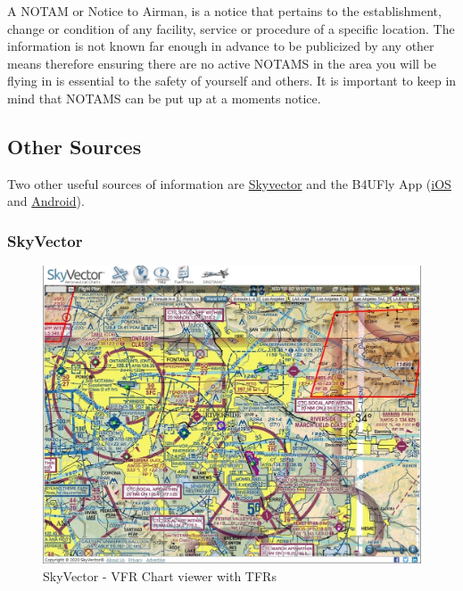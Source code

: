 \documentclass[
  12pt,
]{book}
\begin{document}
A NOTAM or Notice to Airman, is a notice that pertains to the establishment, change or condition of any facility, service or procedure of a specific location. The information is not known far enough in advance to be publicized by any other means therefore ensuring there are no active NOTAMS in the area you will be flying in is essential to the safety of yourself and others. It is important to keep in mind that NOTAMS can be put up at a moments notice.

\hypertarget{other-sources}{%
\subsection{Other Sources}\label{other-sources}}

Two other useful sources of information are \href{https://skyvector.com/}{Skyvector} and the B4UFly App (\href{https://apps.apple.com/us/app/b4ufly/id992427109}{iOS} and \href{https://play.google.com/store/apps/details?id=gov.faa.b4ufly2\&hl=en}{Android}).

\hypertarget{skyvector}{%
\subsubsection{SkyVector}\label{skyvector}}

\begin{figure}

{\centering \includegraphics[width=0.9\linewidth]{images/skyvector} 

}

\caption{SkyVector - VFR Chart viewer with TFRs}\label{fig:skyvector}
\end{figure}
\end{document}
